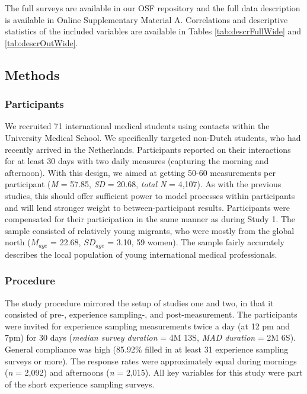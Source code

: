 The full surveys are available in our OSF repository
\citep{KreienkampMasked2022a} and the full data description is available
in Online Supplementary Material A. Correlations and descriptive
statistics of the included variables are available in Tables
\ref{tab:descrFullWide} and \ref{tab:descrOutWide}.

\subsection{Methods}

\subsubsection{Participants}

We recruited 71 international medical students using contacts within the
University Medical School. We specifically targeted non-Dutch students,
who had recently arrived in the Netherlands. Participants reported on
their interactions for at least 30 days with two daily measures
(capturing the morning and afternoon). With this design, we aimed at
getting 50-60 measurements per participant (\textit{M} = 57.85,
\textit{SD} = 20.68, \textit{total N} = 4,107). As with the previous
studies, this should offer sufficient power to model processes within
participants and will lend stronger weight to between-participant
results. Participants were compensated for their participation in the
same manner as during Study 1. The sample consisted of relatively young
migrants, who were mostly from the global north (\(M_{age}\) = 22.68,
\(SD_{age}\) = 3.10, 59 women). The sample fairly accurately describes
the local population of young international medical professionals.

\subsubsection{Procedure}

The study procedure mirrored the setup of studies one and two, in that
it consisted of pre-, experience sampling-, and post-measurement. The
participants were invited for experience sampling measurements twice a
day (at 12 pm and 7pm) for 30 days (\textit{median survey duration} = 4M
13S, \textit{MAD duration} = 2M 6S). General compliance was high
(85.92\% filled in at least 31 experience sampling surveys or more). The
response rates were approximately equal during mornings (\textit{n} =
2,092) and afternoons (\textit{n} = 2,015). All key variables for this
study were part of the short experience sampling surveys.

